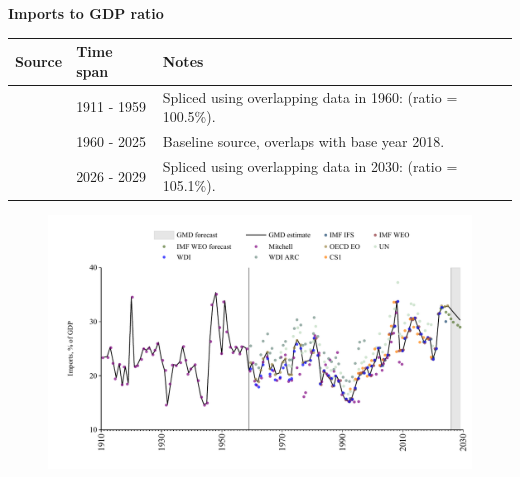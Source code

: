\documentclass[12pt,a4paper,landscape]{article}
\begin{document}
\begin{adjustbox}{max totalsize={\paperwidth}{\paperheight},center}
\begin{minipage}[t][\textheight][t]{\textwidth}
\begin{figure}[H]
\end{figure}
\end{minipage}
\end{adjustbox}
\begin{adjustbox}{max totalsize={\paperwidth}{\paperheight},center}
\begin{minipage}[t][\textheight][t]{\textwidth}
\vspace*{0.5cm}
{}
\begin{center}
{\Large\bfseries Imports to GDP ratio}
\end{center}
\vspace{0.5cm}
\begin{table}[H]
\centering
\small
\begin{tabular}{|l|l|l|}
\hline
\textbf{Source} & \textbf{Time span} & \textbf{Notes} \\
\hline
\rowcolor{white}\cite{Mitchell}& 1911 - 1959 &Spliced using overlapping data in 1960: (ratio = 100.5\%). \\
\rowcolor{lightgray}\cite{OECD_EO}& 1960 - 2025 &Baseline source, overlaps with base year 2018. \\
\rowcolor{white}\cite{IMF_WEO_forecast}& 2026 - 2029 &Spliced using overlapping data in 2030: (ratio = 105.1\%). \\
\hline
\end{tabular}
\end{table}
\begin{figure}[H]
\centering
\includegraphics[width=\textwidth,height=0.6\textheight,keepaspectratio]{graphs/ZAF_imports_GDP.pdf}
\end{figure}
\end{minipage}
\end{adjustbox}
\end{document}
